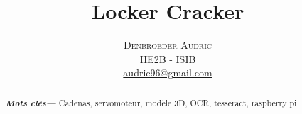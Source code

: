 \documentclass[twoside]{article}
\title{\vspace{-15mm}\fontsize{24pt}{10pt}\selectfont\textbf{Locker Cracker}} %
\author{
\large
\textsc{Denbroeder Audric}\\[2mm] %
\normalsize HE2B - ISIB \\ %
\normalsize \href{mailto:audric96@gmail.com}{audric96@gmail.com} %
\vspace{-5mm}
}
\date{}
\providecommand{\keywords}[1]
{
  \small
  \textbf{\textit{Mots clés---}} #1
}
\begin{document}
\maketitle %

\thispagestyle{fancy} %


\begin{abstract}

\keywords{Cadenas, servomoteur, modèle 3D, OCR, tesseract, raspberry pi}

\end{abstract}

\end{document}
